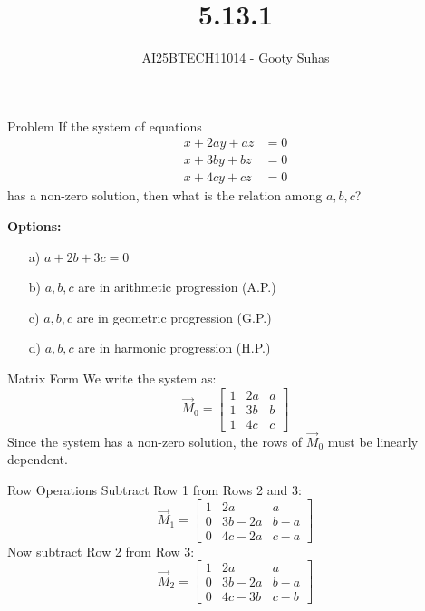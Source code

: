 \documentclass{beamer}
\title{5.13.1}
\author{AI25BTECH11014 - Gooty Suhas}
\begin{document}
\frame{\titlepage}





\begin{frame}{Problem}
If the system of equations
\[
\begin{aligned}
x + 2a y + a z &= 0 \\
x + 3b y + b z &= 0 \\
x + 4c y + c z &= 0
\end{aligned}
\]
has a non-zero solution, then what is the relation among \( a, b, c \)?

\vspace{0.5em}
\textbf{Options:}
\begin{itemize}
  \item[a)] \( a + 2b + 3c = 0 \)
  \item[b)] \( a, b, c \) are in arithmetic progression (A.P.)
  \item[c)] \( a, b, c \) are in geometric progression (G.P.)
  \item[d)] \( a, b, c \) are in harmonic progression (H.P.)
\end{itemize}
\end{frame}






\begin{frame}{Matrix Form}
We write the system as:
\[
\vec{M}_0 =
\begin{bmatrix}
1 & 2a & a \\
1 & 3b & b \\
1 & 4c & c
\end{bmatrix}
\]
Since the system has a non-zero solution, the rows of \( \vec{M}_0 \) must be linearly dependent.
\end{frame}

\begin{frame}{Row Operations}
Subtract Row 1 from Rows 2 and 3:
\[
\vec{M}_1 =
\begin{bmatrix}
1 & 2a & a \\
0 & 3b - 2a & b - a \\
0 & 4c - 2a & c - a
\end{bmatrix}
\]
Now subtract Row 2 from Row 3:
\[
\vec{M}_2 =
\begin{bmatrix}
1 & 2a & a \\
0 & 3b - 2a & b - a \\
0 & 4c - 3b & c - b
\end{bmatrix}
\]
\end{frame}
\end{document}
